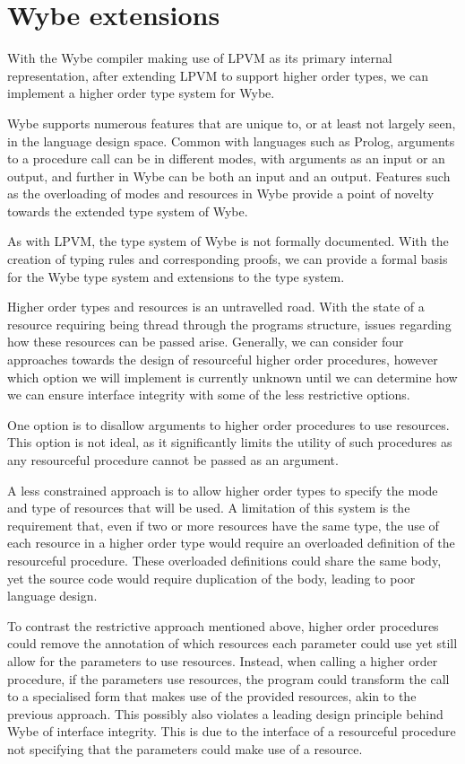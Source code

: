 \section{Wybe extensions}
\label{sec:plan-wybe}

With the Wybe compiler making use of LPVM as its primary internal representation, after extending LPVM to support higher order types, we can implement a higher order type system for Wybe. 

Wybe supports numerous features that are unique to, or at least not largely seen, in the language design space. Common with languages such as Prolog, arguments to a procedure call can be in different modes, with arguments as an input or an output, and further in Wybe can be both an input and an output. Features such as the overloading of modes and resources in Wybe provide a point of novelty towards the extended type system of Wybe. 

As with LPVM, the type system of Wybe is not formally documented. With the creation of typing rules and corresponding proofs, we can provide a formal basis for the Wybe type system and extensions to the type system. 

Higher order types and resources is an untravelled road. With the state of a resource requiring being thread through the programs structure, issues regarding how these resources can be passed arise. Generally, we can consider four approaches towards the design of resourceful higher order procedures, however which option we will implement is currently unknown until we can determine how we can ensure interface integrity with some of the less restrictive options. 

One option is to disallow arguments to higher order procedures to use resources. This option is not ideal, as it significantly limits the utility of such procedures as any resourceful procedure cannot be passed as an argument. 

A less constrained approach is to allow higher order types to specify the mode and type of resources that will be used. A limitation of this system is the requirement that, even if two or more resources have the same type, the use of each resource in a higher order type would require an overloaded definition of the resourceful procedure. These overloaded definitions could share the same body, yet the source code would require duplication of the body, leading to poor language design.

To contrast the restrictive approach mentioned above, higher order procedures could remove the annotation of which resources each parameter could use yet still allow for the parameters to use resources. Instead, when calling a higher order procedure, if the parameters use resources, the program could transform the call to a specialised form that makes use of the provided resources, akin to the previous approach. This possibly also violates a leading design principle behind Wybe of interface integrity. This is due to the interface of a resourceful procedure not specifying that the parameters could make use of a resource.

